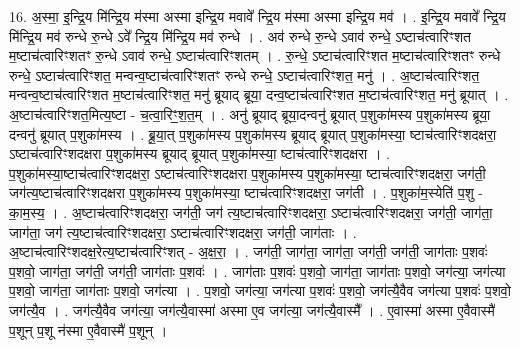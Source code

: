\documentclass[17pt]{extarticle}
\begin{document}
16. अ॒स्मा॒ इ॒न्द्रि॒य मि॑न्द्रि॒य म॑स्मा अस्मा इन्द्रि॒य मवावे᳚ न्द्रि॒य म॑स्मा अस्मा इन्द्रि॒य मव॑ । . इ॒न्द्रि॒य मवावे᳚ न्द्रि॒य मि॑न्द्रि॒य मव॑ रुन्धे रु॒न्धे ऽवे᳚ न्द्रि॒य मि॑न्द्रि॒य मव॑ रुन्धे । . अव॑ रुन्धे रु॒न्धे ऽवाव॑ रुन्धे॒ ऽष्टाच॑त्वारिꣳशत म॒ष्टाच॑त्वारिꣳशतꣳ रु॒न्धे ऽवाव॑ रुन्धे॒ ऽष्टाच॑त्वारिꣳशतम् । . रु॒न्धे॒ ऽष्टाच॑त्वारिꣳशत म॒ष्टाच॑त्वारिꣳशतꣳ रुन्धे रुन्धे॒ ऽष्टाच॑त्वारिꣳशत॒ मन्वन्व॒ष्टाच॑त्वारिꣳशतꣳ रुन्धे रुन्धे॒ ऽष्टाच॑त्वारिꣳशत॒ मनु॑ । . अ॒ष्टाच॑त्वारिꣳशत॒ मन्वन्व॒ष्टाच॑त्वारिꣳशत म॒ष्टाच॑त्वारिꣳशत॒ मनु॑ ब्रूयाद् ब्रूया॒ दन्व॒ष्टाच॑त्वारिꣳशत म॒ष्टाच॑त्वारिꣳशत॒ मनु॑ ब्रूयात् । . अ॒ष्टाच॑त्वारिꣳशत॒मित्य॒ष्टा - च॒त्वा॒रिꣳ॒॒श॒त॒म् । . अनु॑ ब्रूयाद् ब्रूया॒दन्वनु॑ ब्रूयात् प॒शुका॑मस्य प॒शुका॑मस्य ब्रूया॒ दन्वनु॑ ब्रूयात् प॒शुका॑मस्य । . ब्रू॒या॒त् प॒शुका॑मस्य प॒शुका॑मस्य ब्रूयाद् ब्रूयात् प॒शुका॑मस्या॒ ष्टाच॑त्वारिꣳशदक्षरा॒ ऽष्टाच॑त्वारिꣳशदक्षरा प॒शुका॑मस्य ब्रूयाद् ब्रूयात् प॒शुका॑मस्या॒ ष्टाच॑त्वारिꣳशदक्षरा । . प॒शुका॑मस्या॒ष्टाच॑त्वारिꣳशदक्षरा॒ ऽष्टाच॑त्वारिꣳशदक्षरा प॒शुका॑मस्य प॒शुका॑मस्या॒ ष्टाच॑त्वारिꣳशदक्षरा॒ जग॑ती॒ जग॑त्य॒ष्टाच॑त्वारिꣳशदक्षरा प॒शुका॑मस्य प॒शुका॑मस्या॒ ष्टाच॑त्वारिꣳशदक्षरा॒ जग॑ती । . प॒शुका॑म॒स्येति॑ प॒शु - का॒म॒स्य॒ । . अ॒ष्टाच॑त्वारिꣳशदक्षरा॒ जग॑ती॒ जग॑ त्य॒ष्टाच॑त्वारिꣳशदक्षरा॒ ऽष्टाच॑त्वारिꣳशदक्षरा॒ जग॑ती॒ जाग॑ता॒ जाग॑ता॒ जग॑ त्य॒ष्टाच॑त्वारिꣳशदक्षरा॒ ऽष्टाच॑त्वारिꣳशदक्षरा॒ जग॑ती॒ जाग॑ताः । . अ॒ष्टाच॑त्वारिꣳशदक्ष॒रेत्य॒ष्टाच॑त्वारिꣳशत् - अ॒क्ष॒रा॒ । . जग॑ती॒ जाग॑ता॒ जाग॑ता॒ जग॑ती॒ जग॑ती॒ जाग॑ताः प॒शवः॑ प॒शवो॒ जाग॑ता॒ जग॑ती॒ जग॑ती॒ जाग॑ताः प॒शवः॑ । . जाग॑ताः प॒शवः॑ प॒शवो॒ जाग॑ता॒ जाग॑ताः प॒शवो॒ जग॑त्या॒ जग॑त्या प॒शवो॒ जाग॑ता॒ जाग॑ताः प॒शवो॒ जग॑त्या । . प॒शवो॒ जग॑त्या॒ जग॑त्या प॒शवः॑ प॒शवो॒ जग॑त्यै॒वैव जग॑त्या प॒शवः॑ प॒शवो॒ जग॑त्यै॒व । . जग॑त्यै॒वैव जग॑त्या॒ जग॑त्यै॒वास्मा॑ अस्मा ए॒व जग॑त्या॒ जग॑त्यै॒वास्मै᳚ । . ए॒वास्मा॑ अस्मा ए॒वैवास्मै॑ प॒शून् प॒शू न॑स्मा ए॒वैवास्मै॑ प॒शून् । \newline
\end{document}

